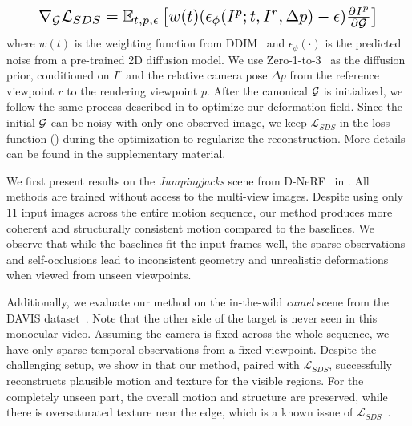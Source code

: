 \begin{equation}
\resizebox{.88\hsize}{!}{$
\nabla_\myset{G}\mathcal{L}_{SDS} = \mathbb{E}_{t,p,\epsilon} \left[ w(t) (\epsilon_\phi(I^p; t,I^r,\Delta p) - \epsilon)  \frac{\partial I^p}{\partial \myset{G}} \right]
$}
\end{equation}
where $w(t)$ is the weighting function from DDIM~\cite{song2020denoising} and $\epsilon_\phi(\cdot)$ is the predicted noise from a pre-trained 2D diffusion model. We use Zero-1-to-3~\cite{liu2023zero} as the diffusion prior, conditioned on $I^r$ and the relative camera pose $\Delta p$ from the reference viewpoint $r$ to the rendering viewpoint $p$. 
After the canonical $\mathcal{G}$ is initialized, we follow the same process described in  to optimize our deformation field. Since the initial $\mathcal{G}$ can be noisy with only one observed image, we keep $\mathcal{L}_{SDS}$ in the loss function () during the optimization to regularize the reconstruction. More details can be found in the supplementary material.

We first present results on the \textit{Jumpingjacks} scene from D-NeRF~\cite{pumarola2021d} in . 
All methods are trained without access to the multi-view images. Despite using only $11$ input images across the entire motion sequence, our method produces more coherent and structurally consistent motion compared to the baselines. We observe that while the baselines fit the input frames well, the sparse observations and self-occlusions lead to inconsistent geometry and unrealistic deformations when viewed from unseen viewpoints.

Additionally, we evaluate our method on the in-the-wild \textit{camel} scene from the DAVIS dataset~\cite{Perazzi_CVPR_2016}. 
Note that the other side of the target is never seen in this monocular video.
Assuming the camera is fixed across the whole sequence, we have only sparse temporal observations from a fixed viewpoint. Despite the challenging setup, we show in  that our method, paired with $\mathcal{L}_{SDS}$, successfully reconstructs plausible motion and texture for the visible regions. For the completely unseen part, the overall motion and structure are preserved, while there is oversaturated texture near the edge, which is a known issue of $\mathcal{L}_{SDS}$~\cite{mcallister2024rethinking,alldieck2024score,lukoianov2024score}.

